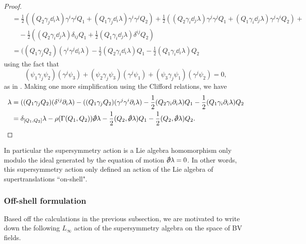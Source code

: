 \documentclass[10pt, oneside]{article}
\begin{document}
\begin{rmk}
\begin{proof}
\begin{align*}
&= \frac 12((Q_2 \gamma_j \dd_i \lambda) \gamma^i \gamma^j Q_1 + (Q_1 \gamma_j \dd_i \lambda) \gamma^i \gamma^j Q_2) + \frac 12((Q_2 \gamma_i \dd_j \lambda) \gamma^j \gamma^j Q_1 + (Q_1 \gamma_i \dd_j \lambda) \gamma^j \gamma^i Q_2) + \\
&\quad - \frac 12((Q_2 \gamma_i \dd_j \lambda) \delta_{ij} Q_1 + \frac 12(Q_1 \gamma_i \dd_j \lambda) \delta^{ij} Q_2) \\
&= ((Q_1 \gamma_j Q_2) (\gamma^i \gamma^j \dd_i \lambda) - \frac 12(Q_2 \gamma_i \dd_i \lambda)Q_1 - \frac 12(Q_1 \gamma_i \dd_i \lambda)Q_2
\end{align*}
using the fact that 
\[(\psi_1 \gamma_j \psi_2)(\gamma^j \psi_3) + (\psi_2 \gamma_j \psi_3)(\gamma^j \psi_1) + (\psi_3 \gamma_j \psi_1)(\gamma^j \psi_2) = 0,\]
as in \cite[Theorem 11]{BaezHuerta}.  Making one more simplification using the Clifford relations, we have
\begin{align*}
[\delta_{Q_1}, \delta_{Q_2}] \lambda &= ((Q_1 \gamma_j Q_2) (\delta^{ij} \dd_i \lambda) - ((Q_1 \gamma_j Q_2) (\gamma^j \gamma^i \dd_i \lambda) - \frac 12(Q_2 \gamma_i \dd_i \lambda)Q_1 - \frac 12(Q_1 \gamma_i \dd_i \lambda)Q_2 \\
&= \delta_{[Q_1,Q_2]} \lambda - \rho(\Gamma(Q_1,Q_2)) \sd \dd \lambda - \frac 12(Q_2, \sd \dd \lambda)Q_1 - \frac 12(Q_2, \sd \dd \lambda)Q_2.
\end{align*}
\end{proof}

In particular the supersymmetry action is a Lie algebra homomorphism only modulo the ideal generated by the equation of motion $\sd \dd \lambda = 0$.
In other words, this supersymmetry action only defined an action of the Lie algebra of supertranslations ``on-shell". 

\subsubsection{Off-shell formulation}

Based off the calculations in the previous subsection, we are motivated to write down the following $L_\infty$ action of the supersymmetry algebra on the space of BV fields.


\end{rmk}
\end{document}
